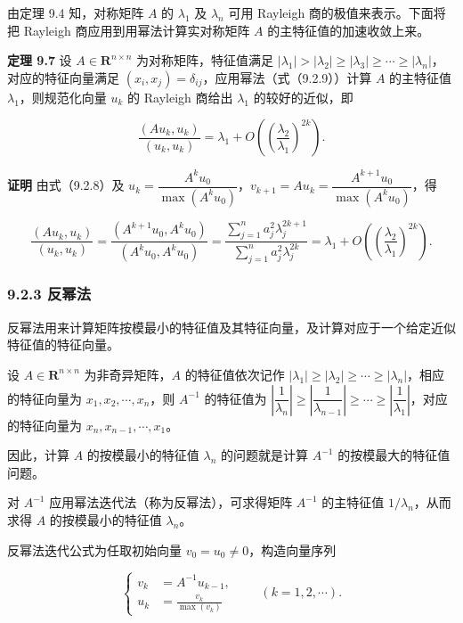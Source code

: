 \documentclass[
  10pt,
  fontset=fandol]{ctexart}
\begin{document}
由定理 9.4 知，对称矩阵 \(A\) 的 \(\lambda_1\) 及 \(\lambda_n\) 可用 Rayleigh 商的极值来表示。下面将把 Rayleigh 商应用到用幂法计算实对称矩阵 \(A\) 的主特征值的加速收敛上来。

\textbf{定理 9.7} 设 \(A\in\mathbf R^{n\times n}\) 为对称矩阵，特征值满足 \(|\lambda_1|>|\lambda_2|\geq|\lambda_3|\geq\cdots\geq|\lambda_n|\)，对应的特征向量满足 \((x_i,x_j)=\delta_{ij}\)，应用幂法（式（9.2.9））计算 \(A\) 的主特征值 \(\lambda_1\)，则规范化向量 \(u_k\) 的 Rayleigh 商给出 \(\lambda_1\) 的较好的近似，即

\[
\frac{(Au_k,u_k)}{(u_k,u_k)}=\lambda_1+O\left(\left(\frac{\lambda_2}{\lambda_1}\right)^{2k}\right).
\]

\textbf{证明} 由式（9.2.8）及 \(u_k=\dfrac{A^ku_0}{\max(A^ku_0)}\)，\(v_{k+1}=Au_k=\dfrac{A^{k+1}u_0}{\max(A^ku_0)}\)，得

\[
\frac{(Au_k,u_k)}{(u_k,u_k)}=\frac{(A^{k+1}u_0,A^ku_0)}{(A^ku_0,A^ku_0)}=\frac{\displaystyle\sum_{j=1}^na_j^2\lambda_j^{2k+1}}{\displaystyle\sum_{j=1}^na_j^2\lambda_j^{2k}}=\lambda_1+O\left(\left(\frac{\lambda_2}{\lambda_1}\right)^{2k}\right).
\tag{9.2.11}
\]

\subsubsection{9.2.3 反幂法}\label{ux53cdux5e42ux6cd5}

反幂法用来计算矩阵按模最小的特征值及其特征向量，及计算对应于一个给定近似特征值的特征向量。

设 \(A\in\mathbf R^{n\times n}\) 为非奇异矩阵，\(A\) 的特征值依次记作 \(|\lambda_1|\geq|\lambda_2|\geq\cdots\geq|\lambda_n|\)，相应的特征向量为 \(x_1,x_2,\cdots,x_n\)，则 \(A^{-1}\) 的特征值为 \(\left|\dfrac1{\lambda_n}\right|\geq\left|\dfrac1{\lambda_{n-1}}\right|\geq\cdots\geq\left|\dfrac1{\lambda_1}\right|\)，对应的特征向量为 \(x_n,x_{n-1},\cdots,x_1\)。

因此，计算 \(A\) 的按模最小的特征值 \(\lambda_n\) 的问题就是计算 \(A^{-1}\) 的按模最大的特征值问题。

对 \(A^{-1}\) 应用幂法迭代法（称为反幂法），可求得矩阵 \(A^{-1}\) 的主特征值 \(1/\lambda_n\)，从而求得 \(A\) 的按模最小的特征值 \(\lambda_n\)。

反幂法迭代公式为任取初始向量 \(v_0=u_0\ne0\)，构造向量序列

\[
\left\{
\begin{aligned}
v_k&=A^{-1}u_{k-1},\\
u_k&=\frac{v_k}{\max(v_k)}
\end{aligned}
\right.\qquad(k=1,2,\cdots).
\]
\end{document}
